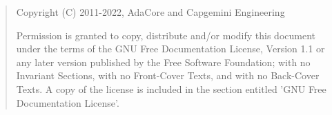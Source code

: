 \bigskip
\begin{quote}
   Copyright (C) 2011-2022, AdaCore and Capgemini Engineering

   Permission is granted to copy, distribute and/or modify this document
   under the terms of the GNU Free Documentation License, Version 1.1
   or any later version published by the Free Software Foundation;
   with no Invariant Sections, with no Front-Cover Texts, and with no
   Back-Cover Texts.
   A copy of the license is included in the section entitled 'GNU
   Free Documentation License'.
\end{quote}
\bigskip
